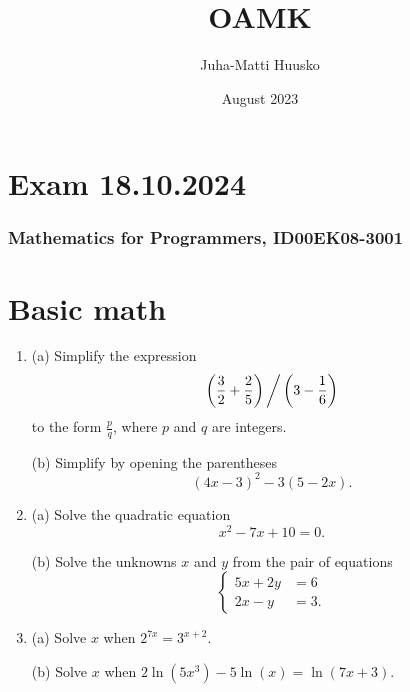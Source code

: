 \documentclass[12pt]{article}
\title{OAMK}
\author{Juha-Matti Huusko}
\date{August 2023}
\renewcommand{\ratkaisu}[1]{{\color{blue}\quad\textrm{Ratkaisu: } #1}}
\renewcommand{\ratkaisu}[1]{}
\begin{document}
\thispagestyle{empty}

\section*{Exam 18.10.2024}
\subsubsection*{Mathematics for Programmers, ID00EK08-3001}

\section*{Basic math}

\begin{enumerate}
\item 
(a) Simplify the expression
$$\left(\frac32+\frac25\right)\bigg/\left(3-\frac16\right)$$\ratkaisu{1/2}
to the form $\frac{p}{q}$, where $p$ and $q$ are integers.

(b) Simplify by opening the parentheses
$$(4x-3)^2-3(5-2x).$$\ratkaisu{$16x^2$}

\item (a) Solve the quadratic equation
$$x^2-7x+10=0.$$\ratkaisu{$x=-1,x=2$}

(b) Solve the unknowns $x$ and $y$ from the pair of equations
$$\begin{cases}
5x+2y&=6\\
2x-y&=3.
\end{cases}\ratkaisu{$x=2/3, y=-1/3$}
$$
\def\a{2}\def\b{7}\def\c{3}\def\d{2} %

\item (a) Solve $x$ when 
$
\a^{\b x}=\c^{x+\d}.
$
\ratkaisu{$x=\frac{\d \ln(\c)}{\b \ln(\a)-\ln(\c)}$}

(b) Solve $x$ when %
$2\ln(5x^3)-5\ln(x)=\ln(7x+3).$\ratkaisu{$x=1/6$} %

\end{enumerate}
\end{document}
